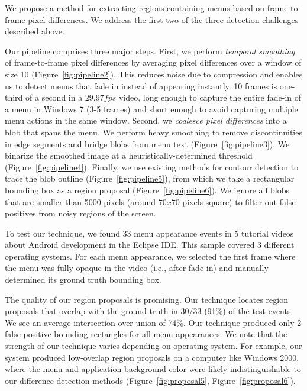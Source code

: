 \documentclass[10pt]{article}
\begin{document}
We propose a method for extracting regions containing menus based on frame-to-frame pixel
differences.  We address the first two of the three detection challenges described above.

Our pipeline comprises three major steps.  First, we perform \emph{temporal smoothing}
of frame-to-frame pixel differences by averaging pixel differences over a window of size 10 
(Figure~\ref{fig:pipeline2}).  This reduces noise due to compression and enables us to detect
menus that fade in instead of appearing instantly.  10 frames is one-third of a second in a $29.97fps$ video, 
long enough to capture the entire fade-in of a menu in Windows 7 (3-5 frames)
and short enough to avoid capturing multiple menu actions in the same window.  Second, we \emph{coalesce
pixel differences} into a blob that spans the menu.  We perform heavy smoothing to remove
discontinuities in edge segments and bridge blobs from menu text (Figure~\ref{fig:pipeline3}).
We binarize the smoothed image at a heuristically-determined threshold (Figure~\ref{fig:pipeline4}).
Finally, we use existing methods for contour detection to trace the blob outline (Figure~\ref{fig:pipeline5}),
from which we take a rectangular bounding box as a region proposal (Figure~\ref{fig:pipeline6}).
We ignore all blobs that are smaller than 5000 pixels (around $70x70$ pixels square) to filter
out false positives from noisy regions of the screen.

To test our technique, we found 33 menu appearance events in 5 tutorial videos about Android development
in the Eclipse IDE.  This sample covered 3 different operating systems.
For each menu appearance, we selected the first frame where the menu was fully opaque in the video
(i.e., after fade-in) and manually determined its ground truth bounding box.

The quality of our region proposals is promising.  Our technique locates region proposals that
overlap with the ground truth in 30/33 (91\%) of the test events.  We see an average 
intersection-over-union of 74\%.  Our technique produced only 2 false positive bounding rectangles 
for all menu appearances.  We note that the strength of our technique varies depending
on operating system.  For example, our system produced low-overlap region proposals
on a computer like Windows 2000, where the menu and application background color were likely
indistinguishable to our difference detection methods (Figure~\ref{fig:proposal5}, Figure~\ref{fig:proposal6}).
\end{document}
